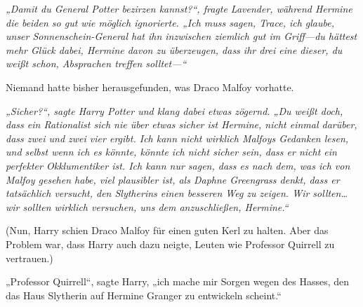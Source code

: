 \emph{„Damit du General Potter bezirzen kannst?“, fragte Lavender, während Hermine die beiden so gut wie möglich ignorierte. „Ich muss sagen, Trace, ich glaube, unser Sonnenschein-General hat ihn inzwischen ziemlich gut im Griff—du hättest mehr Glück dabei, Hermine davon zu überzeugen, dass ihr drei eine dieser, du weißt schon, Absprachen treffen solltet—“}

Niemand hatte bisher herausgefunden, was Draco Malfoy vorhatte.

\emph{„Sicher?“, sagte Harry Potter und klang dabei etwas zögernd. „Du weißt doch, dass ein Rationalist sich nie über etwas sicher ist Hermine, nicht einmal darüber, dass zwei und zwei vier ergibt. Ich kann nicht wirklich Malfoys Gedanken lesen, und selbst wenn ich es könnte, könnte ich nicht sicher sein, dass er nicht ein perfekter Okklumentiker ist. Ich kann nur sagen, dass es nach dem, was ich von Malfoy gesehen habe, viel plausibler ist, als Daphne Greengrass denkt, dass er tatsächlich versucht, den Slytherins einen besseren Weg zu zeigen. Wir sollten… wir sollten wirklich versuchen, uns dem anzuschließen, Hermine.“}

(Nun, Harry schien Draco Malfoy für einen guten Kerl zu halten. Aber das Problem war, dass Harry auch dazu neigte, Leuten wie Professor Quirrell zu vertrauen.)

\later

„Professor Quirrell“, sagte Harry, „ich mache mir Sorgen wegen des Hasses, den das Haus Slytherin auf Hermine Granger zu entwickeln scheint.“

